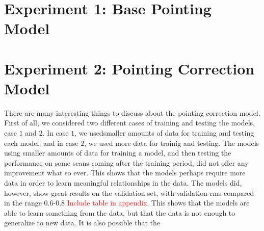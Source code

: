 \section{Experiment 1: Base Pointing Model}
 

\section{Experiment 2: Pointing Correction Model}
There are many interesting things to discuss about the pointing correction model.
First of all, we considered two different cases of training and testing the models, case $1$ and $2$.
In case $1$, we usedsmaller amounts of data for training and testing each model, and in case $2$, we used more data for trainig and testing.
The models using smaller amounts of data for training a model, and then testing the performance on some scans coming after the training period, 
did not offer any improvement what so ever. This shows that the models perhaps require more data in order to learn meaningful relationships in the data.
The models did, however, show great results on the validation set, with validation rms compared in the range $0.6$-$0.8$ \textcolor{red}{Include table in appendix}.
This shows that the models are able to learn something from the data, but that the data is not enough to generalize to new data.
It is also possible that the 
